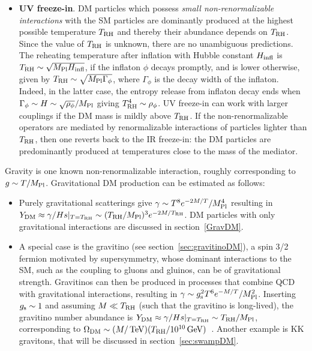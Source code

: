 \begin{itemize}
\item[$\blacktriangle$] 
{\bf UV freeze-in}. 
DM particles which possess {\em small non-renormalizable interactions} with the SM particles 
are dominantly produced at the highest possible temperature $T_{\rm RH}$ 
and thereby their abundance depends on $T_{\rm RH}$.
Since the value of $T_{\rm RH}$ is unknown, there are no  unambiguous predictions.
The reheating temperature after inflation with Hubble constant $H_{\rm infl}$ is $T_{\rm RH} \sim \sqrt{M_{\rm Pl} H_{\rm infl}}$, if the inflaton $\phi$ decays promptly, and is lower otherwise, given by
$T_{\rm RH}\sim \sqrt{M_{\rm Pl} \Gamma_\phi }$, where $\Gamma_\phi$ is the decay width of the inflaton. 
Indeed, in the latter case, the entropy release from inflaton decay ends when $\Gamma_\phi \sim H \sim \sqrt{\rho_\phi}/M_{\rm Pl}$ giving $T_{\rm RH}^4\sim \rho_\phi$.
UV freeze-in can work with larger couplings if the DM mass is mildly above $T_{\rm RH}$.
If the non-renormalizable operators are mediated by renormalizable interactions of particles lighter than $T_{\rm RH}$,
then one reverts back to the IR freeze-in: 
the DM particles are predominantly produced at temperatures close to the mass of the mediator.





\end{itemize}
Gravity is one known non-renormalizable interaction, roughly corresponding to $g \sim T/M_{\rm Pl}$.
Gravitational DM production can be estimated as follows:
\begin{itemize}
\item[$-$]
Purely gravitational scatterings give $\gamma \sim T^8 e^{-2M/T} /M_{\rm Pl}^4$
resulting in $Y_{\rm DM}  \approx \gamma/H s|_{T =T_{\rm RH}}  \sim (T_{\rm RH}/M_{\rm Pl})^3 e^{-2M/T_{\rm RH}}$.
DM particles with only gravitational interactions are discussed in section~\ref{GravDM}.
\item[$-$]
A special case is the gravitino (see section~\ref{sec:gravitinoDM}), 
a spin 3/2 fermion motivated by supersymmetry,
whose dominant interactions to the SM, such as the coupling to gluons and gluinos, can be of gravitational strength.
Gravitinos can then be produced in processes that combine QCD with gravitational interactions, resulting in
$\gamma \sim g_{\rm s}^2 T^6 e^{-M/T} /M_{\rm Pl}^2$.
Inserting $g_{\rm s} \sim 1$ and
assuming $M \ll T_{\rm RH}$ (such that the gravitino is long-lived),
the gravitino number abundance is
$Y_{\rm DM}  \approx \gamma/H s|_{T =T_{\rm RH}}  \sim T_{\rm RH}/M_{\rm Pl}$, corresponding to
$\Omega _{\rm DM} \sim (M/\,{\rm TeV})(T_{\rm RH}/10^{10}\,{\rm GeV})$~\cite{gravitinoCosmo}.
Another example is KK gravitons, that will be discussed in section~\ref{sec:swampDM}.
\end{itemize}

